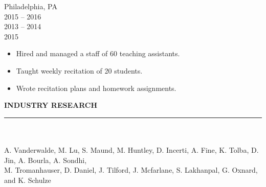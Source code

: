 \documentclass{resume} %
\begin{document}
\hspace*{1mm}{\bf University of Pennsylvania } \hfill Philadelphia, PA \\
\hspace*{1mm}{\em Head Teaching Assistant, Introduction to Computer Programming} \hfill 2015 -- 2016 \\
\hspace*{1mm}{\em Teaching Assistant, Introduction to Computer Programming} \hfill 2013 -- 2014 \\
\hspace*{1mm}{\em Teaching Assistant, JavaScript} \hfill 2015
\begin{itemize}[nosep, topsep=-5mm, label=-]
    \item Hired and managed a staff of 60 teaching assistants.
    \item Taught weekly recitation of 20 students.
    \item Wrote recitation plans and homework assignments.
\end{itemize}
\vspace{5mm}



\medskip
\MakeUppercase{{\bf Industry Research}}
\medskip
\hrule

\hspace*{1mm}{\bf P10.14 ctDNA and Real-World Response (rwR) in Patients With Lung Cancer From A
Prospective} \\
\hspace*{1mm}{\bf Real-World Clinico-Genomic (PCG) Study} \\
\hspace*{1mm}A. Vanderwalde, M. Lu, S. Maund, M. Huntley, D. Incerti, A. Fine, K. Tolba, D. Jin, A.
Bourla, A. Sondhi, \\
\hspace*{1mm}M. Tromanhauser, D. Daniel, J. Tilford, J. Mcfarlane, S. Lakhanpal, G. Oxnard,
and K. Schulze \\
\hspace*{1mm}{\em Poster presented at the World Conference on Lung Cancer 2021, Virtual.}
\end{document}
